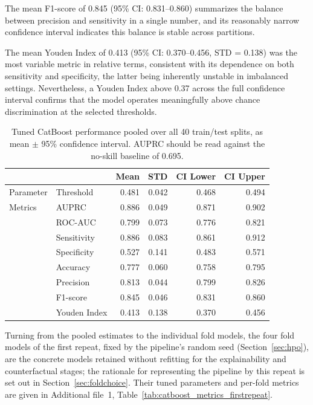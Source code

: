 \documentclass[pdflatex,sn-mathphys-num]{sn-jnl}%
\theoremstyle{thmstyleone}%
\theoremstyle{thmstyletwo}%
\theoremstyle{thmstylethree}%
\begin{document}
The mean F1-score of 0.845 (95\% CI: 0.831--0.860) summarizes the balance between precision and sensitivity in a single number, and its reasonably narrow confidence interval indicates this balance is stable across partitions.

The mean Youden Index of 0.413 (95\% CI: 0.370--0.456, STD = 0.138) was the most variable metric in relative terms, consistent with its dependence on both sensitivity and specificity, the latter being inherently unstable in imbalanced settings. Nevertheless, a Youden Index above 0.37 across the full confidence interval confirms that the model operates meaningfully above chance discrimination at the selected thresholds.

\begin{table}[tbp]
    \centering
    \footnotesize
    \begin{tabular}{llrrrr}
        \toprule
        &  & Mean & STD & CI Lower & CI Upper \\
        \midrule
        Parameter & Threshold & 0.481 & 0.042 & 0.468 & 0.494 \\
        \midrule
        Metrics &  AUPRC & 0.886 & 0.049 & 0.871 & 0.902 \\
        & ROC-AUC & 0.799 & 0.073 & 0.776 & 0.821 \\
        & Sensitivity & 0.886 & 0.083 & 0.861 & 0.912 \\
        & Specificity & 0.527 & 0.141 & 0.483 & 0.571 \\
        & Accuracy & 0.777 & 0.060 & 0.758 & 0.795 \\
        & Precision & 0.813 & 0.044 & 0.799 & 0.826 \\
        & F1-score & 0.845 & 0.046 & 0.831 & 0.860 \\
        & Youden Index & 0.413 & 0.138 & 0.370 & 0.456 \\
        \bottomrule
    \end{tabular}

    \caption{Tuned CatBoost performance pooled over all 40 train/test splits, as mean $\pm$ 95\% confidence
interval. AUPRC should be read against the no-skill baseline of 0.695.}
    \label{tab:optimization_metrics_40repeats}
\end{table}

Turning from the pooled estimates to the individual fold models, the four fold models of the first
repeat, fixed by the pipeline's random seed
(Section~\ref{sec:hpo}), are the concrete models retained without refitting for the explainability
and counterfactual stages; the rationale for representing the pipeline by this repeat is set out in
Section~\ref{sec:foldchoice}. Their tuned parameters and per-fold metrics are given in Additional
file~1, Table~\ref{tab:catboost_metrics_firstrepeat}.
\end{document}
